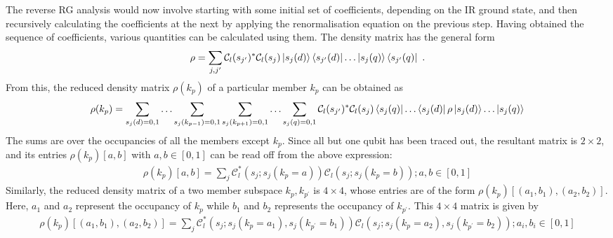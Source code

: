 \documentclass[prb]{revtex4-2}
\begin{document}
The reverse RG analysis would now involve starting with some initial set of coefficients, depending on the IR ground state, and then recursively calculating the coefficients at the next by applying the renormalisation equation on the previous step. Having obtained the sequence of coefficients, various quantities can be calculated using them. The density matrix has the general form
\begin{equation}\begin{aligned}
\rho = \sum_{j,j^\prime}\mathcal{C}_l(s_{j^\prime})^*\mathcal{C}_l(s_{j}) \ket{s_j(d)}\bra{s_{j^\prime}(d)}\ldots\ket{s_j(q)}\bra{s_{j^\prime}(q)}~.
\end{aligned}\end{equation}
From this, the reduced density matrix \(\rho(k_p)\) of a particular member \(k_p\) can be obtained as
\begin{equation}\begin{aligned}
\rho(k_p) = \sum_{s_j(d)=0,1}\ldots\sum_{s_j(k_{p-1})=0,1}\sum_{s_j(k_{p+1})=0,1}\ldots\sum_{s_j(q)=0,1}\mathcal{C}_l(s_{j^\prime})^*\mathcal{C}_l(s_{j})\bra{s_j(q)}\ldots\bra{s_j(d)}\rho\ket{s_j(d)}\ldots\ket{s_j(q)}
\end{aligned}\end{equation}
The sums are over the occupancies of all the members except \(k_p\). Since all but one qubit has been traced out, the resultant matrix is \(2\times 2\), and its entries \(\rho(k_p)[a,b]\) with \(a,b \in [0,1]\) can be read off from the above expression:
\begin{equation}\begin{aligned}
	\rho(k_p)[a,b] = \sum_{j}\mathcal{C}_l^*(s_j;s_j(k_p=a))\mathcal{C}_l(s_j;s_j(k_p=b)); a,b \in [0,1]
\end{aligned}\end{equation}
Similarly, the reduced density matrix of a two member subspace \(k_p,k_{p^\prime}\) is \(4\times 4\), whose entries are of the form \(\rho(k_p)[(a_1,b_1), (a_2,b_2)]\). Here, \(a_1\) and \(a_2\) represent the occupancy of \(k_p\) while \(b_1\) and \(b_2\) represents the occupancy of \(k_{p^\prime}\). This \(4\times 4\) matrix is given by
\begin{equation}\begin{aligned}
	\rho(k_p)[(a_1,b_1), (a_2,b_2)] = \sum_{j}\mathcal{C}_l^*(s_j;s_j(k_p=a_1),s_j(k_{p^\prime}=b_1))\mathcal{C}_l(s_j;s_j(k_p=a_2),s_j(k_{p^\prime}=b_2)); a_i,b_i \in [0,1]
\end{aligned}\end{equation}
\end{document}
